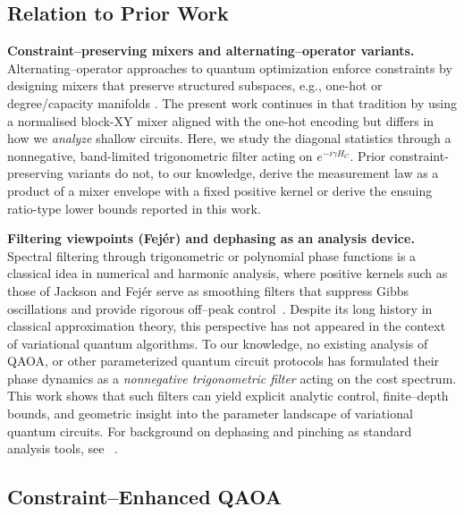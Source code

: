 \documentclass[a4paper,unpublished,onecolumn,11pt]{quantumarticle}
\theoremstyle{definition}
\theoremstyle{remark}
\begin{document}
\subsection{Relation to Prior Work}
\label{sec:background}

\medskip\noindent
\textbf{Constraint–preserving mixers and alternating–operator variants.}
Alternating–operator approaches to quantum optimization enforce constraints by designing mixers that preserve structured subspaces, e.g., one-hot or degree/capacity manifolds \cite{Hadfield2019AOA,Fuchs2022ConstrainedMixers,tsvelikhovskiy2024symmetries}. The present work continues in that tradition by using a normalised block-XY mixer aligned with the one-hot encoding but differs in how we \emph{analyze} shallow circuits. Here, we study the diagonal statistics through a nonnegative, band-limited trigonometric filter acting on \(e^{-i\gamma H_C}\). Prior constraint-preserving variants do not, to our knowledge, derive the measurement law as a product of a mixer envelope with a fixed positive kernel or derive the ensuing ratio-type lower bounds reported in this work.




\medskip\noindent
\textbf{Filtering viewpoints (Fej\'er) and dephasing as an analysis device.}
Spectral filtering through trigonometric or polynomial phase functions is a classical idea in numerical and harmonic analysis, where positive kernels such as those of Jackson and Fej\'er serve as smoothing filters that suppress Gibbs oscillations and provide rigorous off--peak control~\cite{WeisseKPM2006}. Despite its long history in classical approximation theory, this perspective has not appeared in the context of variational quantum algorithms. To our knowledge, no existing analysis of QAOA, or other parameterized quantum circuit protocols has formulated their phase dynamics as a \emph{nonnegative trigonometric filter} acting on the cost spectrum. This work shows that such filters can yield explicit analytic control, finite--depth bounds, and geometric insight into the parameter landscape of variational quantum circuits. For background on dephasing and pinching as standard analysis tools, see ~\cite{Watrous2018,TomamichelFiniteResources}.







\medskip\noindent
\subsection{Constraint–Enhanced QAOA}
\label{sec:ce-qaoa}
\end{document}

